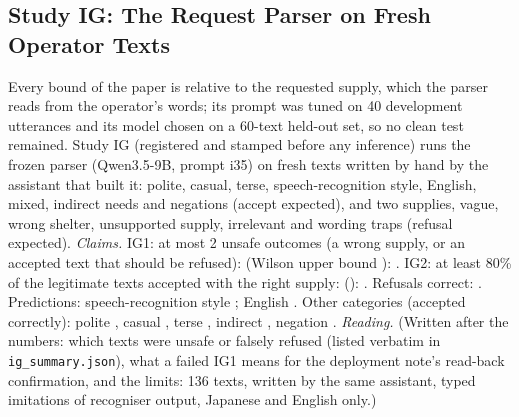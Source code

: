 \subsection{Study IG: The Request Parser on Fresh Operator Texts}\label{sec:moved-ig}
Every bound of the paper is relative to the requested supply, which the parser reads from the operator's words; its prompt was tuned on 40 development utterances and its model chosen on a 60-text held-out set, so no clean test remained. Study IG (registered and stamped before any inference) runs the frozen parser (Qwen3.5-9B, prompt i35) on \IGTexts{} fresh texts written by hand by the assistant that built it: polite, casual, terse, speech-recognition style, English, mixed, indirect needs and negations (accept expected), and two supplies, vague, wrong shelter, unsupported supply, irrelevant and wording traps (refusal expected).
\emph{Claims.} IG1: at most 2 unsafe outcomes (a wrong supply, or an accepted text that should be refused): \IGUnsafe{} (Wilson upper bound \IGUnsafeUpper): \IGOneHolds. IG2: at least 80\% of the legitimate texts accepted with the right supply: \IGAccepted{} (\IGAcceptedRate): \IGTwoHolds. Refusals correct: \IGRefused. Predictions: speech-recognition style \IGAsr{} \IGPredOneHolds; English \IGEnglish{} \IGPredTwoHolds. Other categories (accepted correctly): polite \IGPolite, casual \IGCasual, terse \IGTerse, indirect \IGIndirect, negation \IGNegation.
\emph{Reading.} (Written after the numbers: which texts were unsafe or falsely refused (listed verbatim in \texttt{ig\_summary.json}), what a failed IG1 means for the deployment note's read-back confirmation, and the limits: 136 texts, written by the same assistant, typed imitations of recogniser output, Japanese and English only.)
